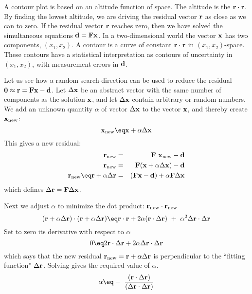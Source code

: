 \par
A contour plot is based on an altitude function of space.
The altitude is the   $\bold r \cdot \bold r$.
By finding the lowest altitude,
we are driving the residual vector  $\bold r$  as close as we can to zero.
If the residual vector  $\bold r$  reaches zero, then we have solved
the simultaneous equations  $\bold d= \bold F \bold x$.
In a two-dimensional world the vector  $\bold x$  has two components,
$(x_1,x_2)$.
A contour is a curve of constant
$\bold r \cdot \bold r$  in $(x_1 , x_2 )$-space.
These contours have a statistical interpretation as contours
of uncertainty in $(x_1 , x_2 )$, with measurement errors in $\bold d$.
\par
Let us see how a random search-direction
can be used to reduce the residual
$\bold 0\approx \bold r= \bold F \bold x - \bold d$.
Let $\Delta \bold x$ be an abstract vector
with the same number of components as the solution $\bold x$,
and let $\Delta \bold x$ contain arbitrary or random numbers.
We add an unknown quantity $\alpha$
of vector $\Delta \bold x$ to the vector $\bold x$,
and thereby create $\bold x_{\rm new}$:
\begin{equation}
\bold x_{\rm new} \eq \bold x+\alpha \Delta \bold x
\label{eqn:oldx}
\end{equation}
This gives a new residual:
\begin{eqnarray}
\bold r_{\rm new} &=& \bold F\ \bold x_{\rm new}           -\bold d \\
\bold r_{\rm new} &=& \bold F( \bold x+\alpha\Delta\bold x)-\bold d\\
\bold r_{\rm new} \eq
\bold r+\alpha \Delta\bold r
                  &=& (\bold F \bold x-\bold d)
                                                +\alpha\bold F\Delta\bold x 
\label{eqn:resupdatelin}
\end{eqnarray}
which defines $\Delta \bold r = \bold F \Delta \bold x$.

\par
Next we adjust $\alpha$ to minimize the dot product:
$ \bold r_{\rm new} \cdot \bold r_{\rm new} $
\begin{equation}
(\bold r+\alpha\Delta \bold r)\cdot (\bold r+\alpha\Delta \bold r) \eq
\bold r\cdot \bold r + 2\alpha (\bold r \cdot \Delta \bold r) \ +\ 
\alpha^2 \Delta \bold r \cdot \Delta \bold r
\label{eqn:mindot}
\end{equation}
Set to zero its derivative with respect to  $\alpha$ 
\begin{equation}
0\eq 
2 \bold r \cdot \Delta \bold r  + 2\alpha \Delta \bold r \cdot \Delta \bold r
\label{eqn:newresperp}
\end{equation}
which says that
the new residual $\bold r_{\rm new} = \bold r + \alpha \Delta \bold r$ is
perpendicular to the ``fitting function'' $\Delta \bold r$.
Solving gives the required value of $\alpha$.
\begin{equation}
\alpha \eq - \ { (\bold r \cdot \Delta \bold r ) \over
( \Delta \bold r \cdot \Delta \bold r ) }
\label{eqn:alfa}
\end{equation}

